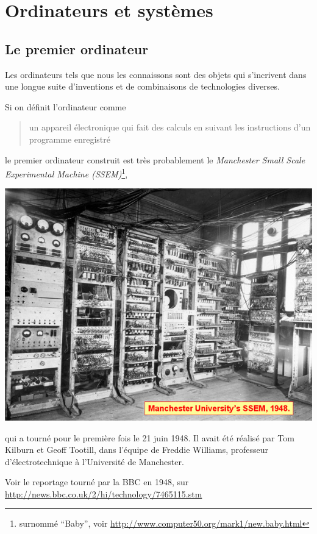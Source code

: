 \chapter{Ordinateurs et systèmes}

\begin{multicols}{2}
\section{Le premier ordinateur}


Les ordinateurs tels que nous les connaissons sont des objets qui
s'incrivent dans une longue suite d'inventions et de combinaisons de
technologies diverses.

Si on définit l'ordinateur comme
\begin{quote}
un appareil électronique qui fait des calculs en suivant les
instructions d'un programme enregistré
\end{quote}
le premier ordinateur construit est très probablement le \emph{Manchester
  Small Scale Experimental Machine (SSEM)}\footnote{surnommé ``Baby'', voir \url{http://www.computer50.org/mark1/new.baby.html}},

\includegraphics[width=0.9\linewidth]{Historique/1_history-ssem.jpg}

 qui a tourné
pour le première fois le 21 juin 1948. Il avait été réalisé par
Tom Kilburn et Geoff Tootill, dans l'équipe de Freddie Williams,
professeur d'électrotechnique à l'Université de Manchester.

Voir le reportage tourné par la BBC en 1948, sur 
\url{http://news.bbc.co.uk/2/hi/technology/7465115.stm}


\end{multicols}
